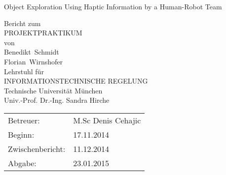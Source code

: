 \documentclass[a4paper,twoside, openright,12pt]{report}
\begin{document}
\pagestyle{empty}
\enlargethispage{4.5cm} %
\begin{center}
\phantom{u}
\vspace{0.5cm}
\Huge{\sc Object Exploration Using Haptic Information by a Human-Robot Team}\\
\vspace{1.5cm}

                                 \large{Bericht zum\\
								PROJEKTPRAKTIKUM \\
					   von\\          

						\vspace{0.4cm}
					Benedikt~Schmidt\\
					\vspace{0.2cm}
					Florian~Wirnshofer\\
						\vspace{4cm}
					Lehrstuhl f\"ur\\
					INFORMATIONSTECHNISCHE REGELUNG \\
					Technische Universit\"at M\"unchen\\
					\vspace{0.6cm}
                    Univ.-Prof. Dr.-Ing. Sandra Hirche}
\end{center}
\vspace{4.0cm}
\begin{tabular}{ll}
Betreuer: & M.Sc Denis Cehajic\\
Beginn: & 17.11.2014  \\
Zwischenbericht: &  11.12.2014  \\
Abgabe: &  23.01.2015 \\
\end{tabular}

\cleardoublepage

\phantom{u}
\end{document}
